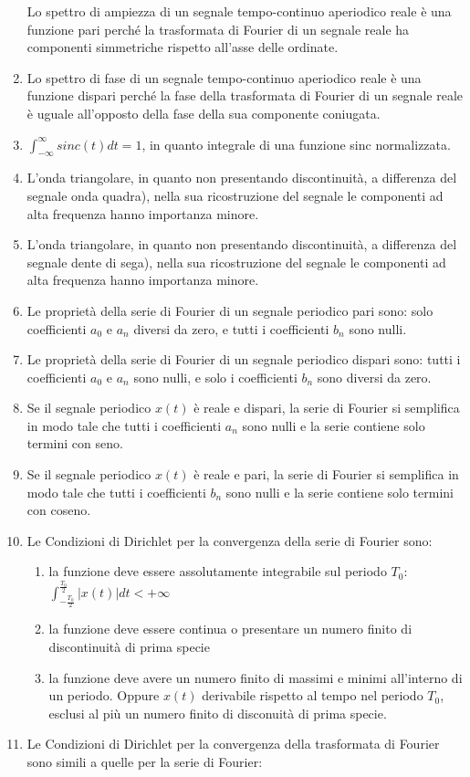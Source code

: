 \documentclass[
]{article}
\providecommand{\tightlist}{%
  \setlength{\itemsep}{0pt}\setlength{\parskip}{0pt}}
\begin{document}
\begin{enumerate}
	Lo spettro di ampiezza di un segnale tempo-continuo aperiodico reale è
	una funzione pari perché la trasformata di Fourier di un segnale reale
	ha componenti simmetriche rispetto all'asse delle ordinate.
	\item
	Lo spettro di fase di un segnale tempo-continuo aperiodico reale è una
	funzione dispari perché la fase della trasformata di Fourier di un
	segnale reale è uguale all'opposto della fase della sua componente
	coniugata.
	\item
	$ \displaystyle \int_{-\infty}^\infty sinc(t)dt = 1$, in quanto integrale di una
	funzione sinc normalizzata.
	\item
	L'onda triangolare, in quanto non presentando discontinuità, a differenza del segnale onda quadra), nella sua ricostruzione del segnale le componenti ad alta frequenza hanno importanza minore.
	\item
L'onda triangolare, in quanto non presentando discontinuità, a differenza del segnale dente di sega), nella sua ricostruzione del segnale le componenti ad alta frequenza hanno importanza minore.
	\item
	Le proprietà della serie di Fourier di un segnale periodico pari sono:
	solo coefficienti \(a_0\) e \(a_n\) diversi da zero, e tutti i
	coefficienti \(b_n\) sono nulli.
	\item
	Le proprietà della serie di Fourier di un segnale periodico dispari
	sono: tutti i coefficienti \(a_0\) e \(a_n\) sono nulli, e solo i
	coefficienti \(b_n\) sono diversi da zero.
	\item
	Se il segnale periodico \(x(t)\) è reale e dispari, la serie di
	Fourier si semplifica in modo tale che tutti i coefficienti \(a_n\)
	sono nulli e la serie contiene solo termini con seno.
	\item
	Se il segnale periodico \(x(t)\) è reale e pari, la serie di Fourier
	si semplifica in modo tale che tutti i coefficienti \(b_n\) sono nulli
	e la serie contiene solo termini con coseno.
	\item
	Le Condizioni di Dirichlet per la convergenza della serie di Fourier
	sono:
	
	\begin{enumerate}
		\def\labelenumii{(\alph{enumii})}
		\tightlist
		\item
		la funzione deve essere assolutamente integrabile sul periodo $T_0$: $\displaystyle \int_{-\frac{T_0}{2}}^{\frac{T_0}{2}} |x(t)| dt < +\infty$
		\item
		la funzione deve essere continua o presentare un numero finito di discontinuità di prima specie
		\item
		la funzione deve avere un numero finito di massimi e minimi
		all'interno di un periodo. Oppure  $x(t)$ derivabile rispetto al tempo nel periodo $T_0$, esclusi al più un numero finito di disconuità di prima specie.
	\end{enumerate}
	\item
	Le Condizioni di Dirichlet per la convergenza della trasformata di
	Fourier sono simili a quelle per la serie di Fourier:
	

\end{enumerate}
\end{document}
